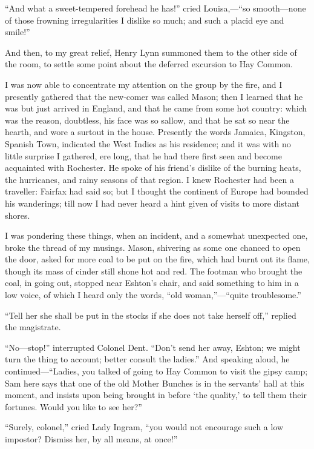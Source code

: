 \enquote{And what a sweet-tempered forehead he has!} cried
Louisa,---\enquote{so smooth---none of those frowning irregularities I
dislike so much; and such a placid eye and smile!}

And then, to my great relief, \Mr{} Henry Lynn summoned them to the other
side of the room, to settle some point about the deferred excursion to
Hay Common.

I was now able to concentrate my attention on the group by the fire, and
I presently gathered that the new-comer was called \Mr{} Mason; then I
learned that he was but just arrived in England, and that he came from
some hot country: which was the reason, doubtless, his face was so
sallow, and that he sat so near the hearth, and wore a surtout in the
house. Presently the words Jamaica, Kingston, Spanish Town, indicated
the West Indies as his residence; and it was with no little surprise I
gathered, ere long, that he had there first seen and become acquainted
with \Mr{} Rochester. He spoke of his friend's dislike of the burning
heats, the hurricanes, and rainy seasons of that region. I knew \Mr{}
 Rochester had been a traveller: \Mrs{} Fairfax had said so; but I thought
the continent of Europe had bounded his wanderings; till now I had never
heard a hint given of visits to more distant shores.

I was pondering these things, when an incident, and a somewhat
unexpected one, broke the thread of my musings. \Mr{} Mason, shivering as
some one chanced to open the door, asked for more coal to be put on the
fire, which had burnt out its flame, though its mass of cinder still
shone hot and red. The footman who brought the coal, in going out,
stopped near \Mr{} Eshton's chair, and said something to him in a low
voice, of which I heard only the words, \enquote{old
woman,}---\enquote{quite troublesome.}

\enquote{Tell her she shall be put in the stocks if she does not take
herself off,} replied the magistrate.

\enquote{No---stop!} interrupted Colonel Dent. \enquote{Don't send her
away, Eshton; we might turn the thing to account; better consult the
ladies.} And speaking aloud, he continued---\enquote{Ladies, you talked
of going to Hay Common to visit the gipsy camp; Sam here says that one
of the old Mother Bunches is in the servants' hall at this moment, and
insists upon being brought in before \enquote{the quality,} to tell
them their fortunes. Would you like to see her?}

\enquote{Surely, colonel,} cried Lady Ingram, \enquote{you would not
encourage such a low impostor? Dismiss her, by all means, at once!}

